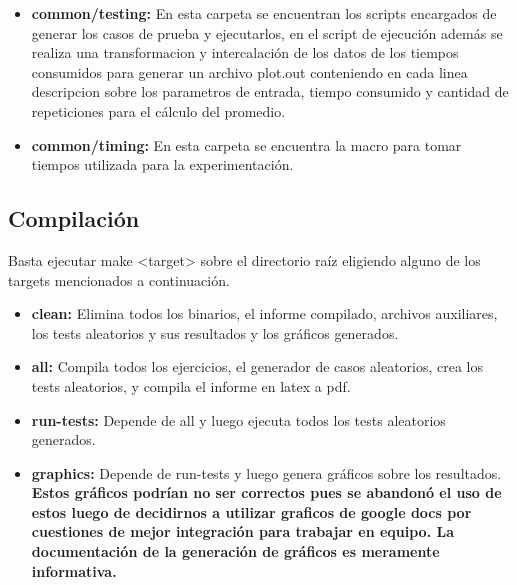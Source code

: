 \begin{itemize}
\begin{itemize}
			\item \textbf{common/testing:} En esta carpeta se encuentran los scripts encargados de generar los casos de prueba y ejecutarlos, en el script de ejecuci\'on adem\'as se realiza una transformacion y intercalaci\'on de los datos de los tiempos consumidos para generar un archivo plot.out conteniendo en cada linea descripcion sobre los parametros de entrada, tiempo consumido y cantidad de repeticiones para el c\'alculo del promedio.
			\item \textbf{common/timing:} En esta carpeta se encuentra la macro para tomar tiempos utilizada para la experimentaci\'on.
		\end{itemize}
\end{itemize}
\subsection{Compilaci\'on}
Basta ejecutar make <target> sobre el directorio ra\'iz eligiendo alguno de los targets mencionados a continuaci\'on.
\begin{itemize}
	\item \textbf{clean:} Elimina todos los binarios, el informe compilado, archivos auxiliares, los tests aleatorios y sus resultados y los gr\'aficos generados.
	\item \textbf{all:} Compila todos los ejercicios, el generador de casos aleatorios, crea los tests aleatorios, y compila el informe en latex a pdf.
	\item \textbf{run-tests:} Depende de all y luego ejecuta todos los tests aleatorios generados.
	\item \textbf{graphics:} Depende de run-tests y luego genera gr\'aficos sobre los resultados. \textbf{Estos gr\'aficos podr\'ian no ser correctos pues se abandon\'o el uso de estos luego de decidirnos a utilizar graficos de google docs por cuestiones de mejor integraci\'on para trabajar en equipo. La documentaci\'on de la generaci\'on de gr\'aficos es meramente informativa.}
\end{itemize}